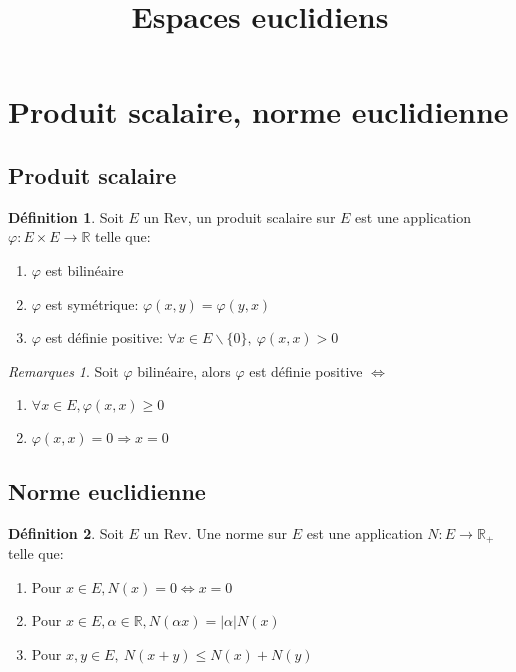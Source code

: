 \documentclass[fleqn]{article}
\title{Espaces euclidiens}
\date{}
\theoremstyle{definition} \newtheorem*{defi}{D\'efinition}
\theoremstyle{definition} \newtheorem*{theo}{Th\'eor\`eme}
\theoremstyle{definition} \newtheorem*{coro}{Corollaire}
\theoremstyle{remark} \newtheorem*{rqs}{Remarques}
\theoremstyle{definition} \newtheorem*{prop}{Propri\'et\'e}
\begin{document}
\maketitle

\section{Produit scalaire, norme euclidienne}
\subsection{Produit scalaire}
\begin{defi} Soit $E$ un Rev, un produit scalaire sur $E$ est une application $\varphi : E \times E \rightarrow \mathbb{R}$ telle que:
\begin{enumerate}
	\item $\varphi$ est bilin\'eaire
	\item $\varphi$ est sym\'etrique: $\varphi(x,y) = \varphi(y,x)$
	\item $\varphi$ est d\'efinie positive: $\forall x \in E \backslash \{0\},\ \varphi(x,x) > 0$
\end{enumerate}
\end{defi}

\begin{rqs} Soit $\varphi$ bilin\'eaire, alors $\varphi$ est d\'efinie positive $\Leftrightarrow$ \begin{enumerate}
	\item $\forall x \in E, \varphi(x,x) \geq 0$
	\item $\varphi(x,x) = 0 \Rightarrow x = 0$
	\end{enumerate}
\end{rqs}

\subsection{Norme euclidienne}
\begin{defi} Soit $E$ un Rev. Une norme sur $E$ est une application $N:E \rightarrow \mathbb{R}_+$ telle que:
	\begin{enumerate}
		\item Pour $x \in E, N(x) = 0 \Leftrightarrow x = 0$
		\item Pour $x \in E, \alpha \in \mathbb{R}, N(\alpha x) = |\alpha| N(x)$
		\item Pour $x,y \in E,\ N(x+y) \leq N(x) + N(y)$
	\end{enumerate}
\end{defi}
\end{document}
